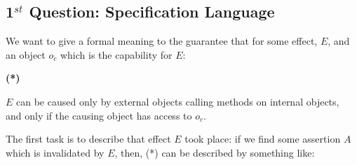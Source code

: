  
 
\subsection{1$^{st}$ Question: Specification Language} 

We want to give a formal meaning to the guarantee that for some effect, $E$, and an object $o_c$ which is the capability for $E$:

\vspace{.1cm}

  \begin{minipage}{.05\textwidth}
   \textbf{(*)}
\end{minipage}
\hfill
\begin{minipage}{.95\textwidth}
\begin{flushleft}
$E$ can be caused only  by external objects calling methods on internal objects, \\
and only if the causing object has access  to $o_c$. 
\end{flushleft}
\end{minipage}

\vspace{.1cm}


\noindent 
The first task is to describe that effect  $E$ took place: if we  find  some assertion $A$ which is invalidated by $E$, then, (*) can be described by something like:

